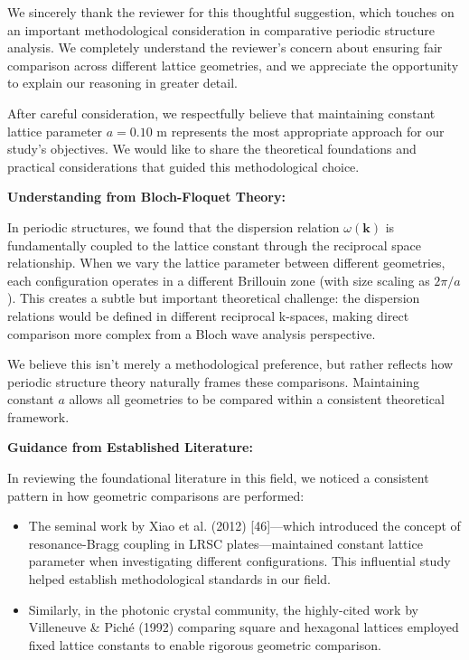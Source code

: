 \documentclass[11pt,a4paper]{article}
\newenvironment{responsebox}{%
    \par\medskip\noindent{\color{responsecolor}\rule{\linewidth}{2pt}}\par
    \noindent{\color{responsecolor}\bfseries Response}\par\smallskip
}{%
    \par\noindent{\color{responsecolor}\rule{\linewidth}{0.5pt}}\medskip
}
\begin{document}
\begin{responsebox}
We sincerely thank the reviewer for this thoughtful suggestion, which touches on an important methodological consideration in comparative periodic structure analysis. We completely understand the reviewer's concern about ensuring fair comparison across different lattice geometries, and we appreciate the opportunity to explain our reasoning in greater detail.

After careful consideration, we respectfully believe that maintaining constant lattice parameter $a = 0.10$ m represents the most appropriate approach for our study's objectives. We would like to share the theoretical foundations and practical considerations that guided this methodological choice.

\textbf{Understanding from Bloch-Floquet Theory:}

In periodic structures, we found that the dispersion relation $\omega(\mathbf{k})$ is fundamentally coupled to the lattice constant through the reciprocal space relationship. When we vary the lattice parameter between different geometries, each configuration operates in a different Brillouin zone (with size scaling as $2\pi/a$). This creates a subtle but important theoretical challenge: the dispersion relations would be defined in different reciprocal k-spaces, making direct comparison more complex from a Bloch wave analysis perspective.

We believe this isn't merely a methodological preference, but rather reflects how periodic structure theory naturally frames these comparisons. Maintaining constant $a$ allows all geometries to be compared within a consistent theoretical framework.

\textbf{Guidance from Established Literature:}

In reviewing the foundational literature in this field, we noticed a consistent pattern in how geometric comparisons are performed:

\begin{itemize}
    \item The seminal work by Xiao et al. (2012) [46]—which introduced the concept of resonance-Bragg coupling in LRSC plates—maintained constant lattice parameter when investigating different configurations. This influential study helped establish methodological standards in our field.

    \item Similarly, in the photonic crystal community, the highly-cited work by Villeneuve \& Piché (1992) comparing square and hexagonal lattices employed fixed lattice constants to enable rigorous geometric comparison.
\end{itemize}


\end{responsebox}
\end{document}
